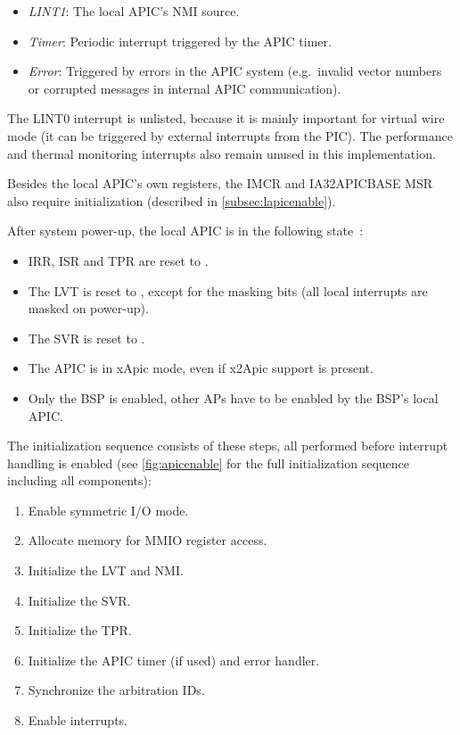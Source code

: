 \begin{itemize}
  \item \textit{LINT1}: The local APIC's NMI source.
  \item \textit{Timer}: Periodic interrupt triggered by the APIC timer.
  \item \textit{Error}: Triggered by errors in the APIC system (e.g.\ invalid vector numbers or corrupted messages in internal APIC communication).
\end{itemize}

The LINT0 interrupt is unlisted, because it is mainly important for virtual wire mode (it can be triggered by external interrupts from the PIC).
The performance and thermal monitoring interrupts also remain unused in this implementation.

Besides the local APIC's own registers, the IMCR and IA32\textunderscore{}APIC\textunderscore{}BASE MSR also require initialization (described in \autoref{subsec:lapicenable}).

After system power-up, the local APIC is in the following state~\autocite[sec.~3.11.4.7]{ia32}:

\begin{itemize}
  \item IRR, ISR and TPR are reset to .
  \item The LVT is reset to , except for the masking bits (all local interrupts are masked on power-up).
  \item The SVR is reset to .
  \item The APIC is in xApic mode, even if x2Apic support is present.
  \item Only the BSP is enabled, other APs have to be enabled by the BSP's local APIC\@.
\end{itemize}

The initialization sequence consists of these steps, all performed before interrupt handling is enabled (see \autoref{fig:apicenable} for the full initialization sequence including all components):

\begin{enumerate}
  \item Enable symmetric I/O mode.
  \item Allocate memory for MMIO register access.
  \item Initialize the LVT and NMI\@.
  \item Initialize the SVR\@.
  \item Initialize the TPR\@.
  \item Initialize the APIC timer (if used) and error handler.
  \item Synchronize the arbitration IDs.
  \item Enable interrupts.
\end{enumerate}

